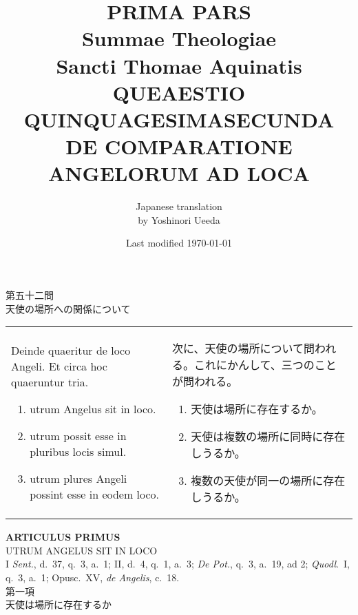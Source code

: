 \documentclass[10pt]{jsarticle} %
\title{{\bf PRIMA PARS}\\{\HUGE Summae Theologiae}\\Sancti Thomae
Aquinatis\\{\sffamily QUEAESTIO QUINQUAGESIMASECUNDA}\\DE COMPARATIONE ANGELORUM AD LOCA}
\author{Japanese translation\\by Yoshinori {\sc Ueeda}}
\date{Last modified \today}
\begin{document}
\maketitle
\pagestyle{fancy}

\begin{center}
{\Large 第五十二問\\天使の場所への関係について}
\end{center}

\begin{longtable}{p{21em}p{21em}}

Deinde quaeritur de loco Angeli. Et circa hoc quaeruntur tria. 
\begin{enumerate}
 \item utrum Angelus sit in loco.
 \item utrum possit esse in pluribus locis simul.
 \item utrum plures Angeli possint esse in eodem loco.
\end{enumerate}

&

次に、天使の場所について問われる。これにかんして、三つのことが問われる。
\begin{enumerate}
 \item 天使は場所に存在するか。
 \item 天使は複数の場所に同時に存在しうるか。
 \item 複数の天使が同一の場所に存在しうるか。
\end{enumerate}


\end{longtable}

\newpage


\begin{center}
 {\Large {\bf ARTICULUS PRIMUS}}\\
 {\large UTRUM ANGELUS SIT IN LOCO}\\
 {\footnotesize I {\itshape Sent.}, d.~37, q.~3, a.~1; II, d.~4, q.~1, a.~3; {\itshape De Pot.}, q.~3, a.~19, ad 2; {\itshape Quodl}.~I, q.~3, a.~1; Opusc.~XV, {\itshape de Angelis}, c.~18.}\\
 {\Large 第一項\\天使は場所に存在するか}
\end{center}
\end{document}
